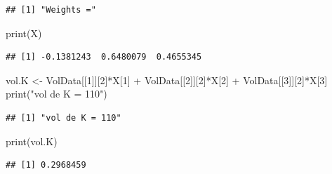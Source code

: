 \documentclass[
]{article}
\newenvironment{Shaded}{\begin{snugshade}}{\end{snugshade}}
\newcommand{\DecValTok}[1]{\textcolor[rgb]{0.00,0.00,0.81}{#1}}
\newcommand{\FunctionTok}[1]{\textcolor[rgb]{0.00,0.00,0.00}{#1}}
\newcommand{\NormalTok}[1]{#1}
\newcommand{\OtherTok}[1]{\textcolor[rgb]{0.56,0.35,0.01}{#1}}
\newcommand{\SpecialCharTok}[1]{\textcolor[rgb]{0.00,0.00,0.00}{#1}}
\newcommand{\StringTok}[1]{\textcolor[rgb]{0.31,0.60,0.02}{#1}}
\begin{document}
\begin{verbatim}
## [1] "Weights ="
\end{verbatim}

\begin{Shaded}
\begin{Highlighting}[]
\FunctionTok{print}\NormalTok{(X)}
\end{Highlighting}
\end{Shaded}

\begin{verbatim}
## [1] -0.1381243  0.6480079  0.4655345
\end{verbatim}

\begin{Shaded}
\begin{Highlighting}[]
\NormalTok{vol.K }\OtherTok{\textless{}{-}}\NormalTok{ VolData[[}\DecValTok{1}\NormalTok{]][}\DecValTok{2}\NormalTok{]}\SpecialCharTok{*}\NormalTok{X[}\DecValTok{1}\NormalTok{] }\SpecialCharTok{+}\NormalTok{ VolData[[}\DecValTok{2}\NormalTok{]][}\DecValTok{2}\NormalTok{]}\SpecialCharTok{*}\NormalTok{X[}\DecValTok{2}\NormalTok{] }\SpecialCharTok{+}\NormalTok{ VolData[[}\DecValTok{3}\NormalTok{]][}\DecValTok{2}\NormalTok{]}\SpecialCharTok{*}\NormalTok{X[}\DecValTok{3}\NormalTok{]}
\FunctionTok{print}\NormalTok{(}\StringTok{"vol de K = 110"}\NormalTok{)}
\end{Highlighting}
\end{Shaded}

\begin{verbatim}
## [1] "vol de K = 110"
\end{verbatim}

\begin{Shaded}
\begin{Highlighting}[]
\FunctionTok{print}\NormalTok{(vol.K)}
\end{Highlighting}
\end{Shaded}

\begin{verbatim}
## [1] 0.2968459
\end{verbatim}
\end{document}
